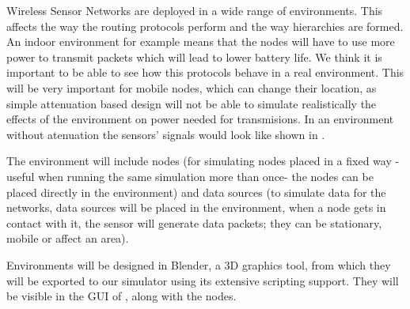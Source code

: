 
Wireless Sensor Networks are deployed in a wide range of environments. This affects
the way the routing protocols perform and the way hierarchies are formed. An indoor
environment for example means that the nodes will have to use more power to transmit
packets which will lead to lower battery life. We think it is important to be able to
see how this protocols behave in a real environment. This will be very important for
mobile nodes, which can change their location, as simple attenuation based design will
not be able to simulate realistically the effects of the environment on power needed for
transmisions. In an environment without atenuation 
the sensors' signals would look like shown in . 

The environment will
include nodes (for simulating nodes placed in a fixed way -useful when running the same
simulation more than once- the nodes can be placed directly in the environment) and data sources
(to simulate data for the networks, data sources will be placed in
the environment, when a node gets in contact with it, the sensor will generate data packets; 
they can be stationary, mobile or affect an area).


Environments will be designed in Blender, a 3D graphics tool, from which they will be
exported to our simulator using its extensive scripting support. They will be visible
in the GUI of \codename, along with the nodes.


